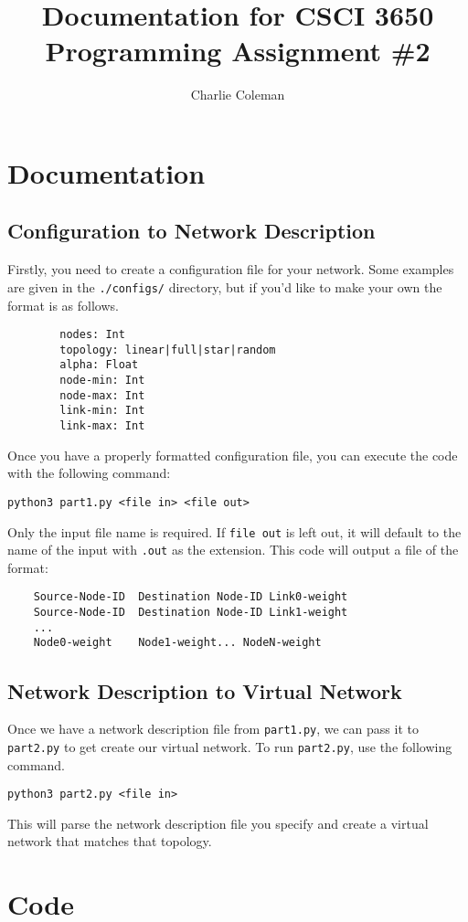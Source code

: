 \documentclass{article}
\title{Documentation for CSCI 3650 Programming Assignment \#2}
\author{Charlie Coleman}
\begin{document}
	\maketitle

	\section{Documentation}

	\subsection{Configuration to Network Description}
	
	Firstly, you need to create a configuration file for your network. Some examples are given in the \texttt{./configs/} directory, but if you'd like to make your own the format is as follows.
	
	\begin{verbatim}
		nodes: Int
		topology: linear|full|star|random
		alpha: Float
		node-min: Int
		node-max: Int
		link-min: Int
		link-max: Int
	\end{verbatim}
	
	Once you have a properly formatted configuration file, you can execute the code with the following command:
	
	\begin{center}
	\verb|python3 part1.py <file in> <file out>|
	\end{center}	
	
	Only the input file name is required. If \texttt{file out} is left out, it will default to the name of the input with \texttt{.out} as the extension. This code will output a file of the format:
	
	\begin{verbatim}
	Source-Node-ID	Destination Node-ID	Link0-weight
	Source-Node-ID	Destination Node-ID	Link1-weight
	...
	Node0-weight	Node1-weight...	NodeN-weight
	\end{verbatim}

	\subsection{Network Description to Virtual Network}
	
	Once we have a network description file from \texttt{part1.py}, we can pass it to \texttt{part2.py} to get create our virtual network. To run \texttt{part2.py}, use the following command.
	
	\begin{center}
	\verb|python3 part2.py <file in>|
	\end{center}
	
	This will parse the network description file you specify and create a virtual network that matches that topology.
	
	\pagebreak
	
	\section{Code}
	
	
	
\end{document}

